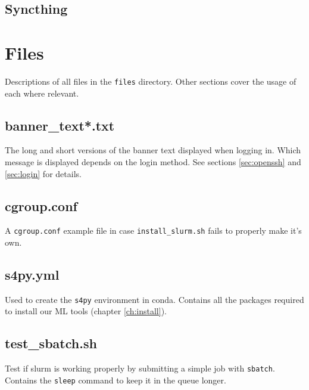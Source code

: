 \documentclass[10pt,letterpaper]{report}
\begin{document}
\section{Syncthing}					\label{sec:syncthing}
	

\chapter{Files}						\label{ch:files}
Descriptions of all files in the \texttt{files} directory. Other sections cover the usage of each where relevant.

\section{banner\_text*.txt}	\label{sec:bannerText}
The long and short versions of the banner text displayed when logging in. Which message is displayed depends on the login method. See sections \ref{sec:openssh} and \ref{sec:login} for details.

\section{cgroup.conf}				\label{sec:cgroup}
A \texttt{cgroup.conf} example file in case \texttt{install\_slurm.sh} fails to properly make it's own.

\section{s4py.yml}					\label{sec:s4py}
Used to create the \texttt{s4py} environment in conda. Contains all the packages required to install our ML tools (chapter \ref{ch:install}).

\section{test\_sbatch.sh}			\label{sec:sbatchTest}
Test if slurm is working properly by submitting a simple job with \texttt{sbatch}. Contains the \texttt{sleep} command to keep it in the queue longer.





\end{document}
